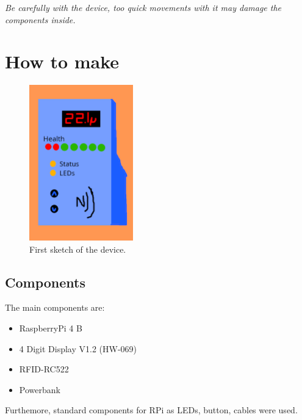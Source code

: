 \documentclass{article}
\begin{document}
\emph{Be carefully with the device, too quick movements with it may damage the components inside.}

\section{How to make}

\begin{figure}
    \centering
    \includegraphics[width=0.4\textwidth]{imgs/Sketch.png}
    \caption{First sketch of the device.}
\end{figure}

\subsection{Components}
The main components are:
\begin{itemize}
    \item RaspberryPi 4 B
    \item 4 Digit Display V1.2 (HW-069) 
    \item RFID-RC522
    \item Powerbank
\end{itemize}
Furthemore, standard components for RPi as LEDs, button, cables were used.
\end{document}
